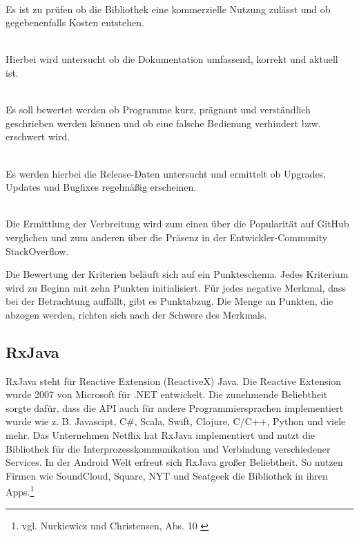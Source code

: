 \begin{description}
\item \criteriaLizenz \\
Es ist zu prüfen ob die Bibliothek eine kommerzielle Nutzung zulässt und ob gegebenenfalls Kosten entstehen.
\item \criteriaDoku \\
Hierbei wird untersucht ob die Dokumentation umfassend, korrekt und aktuell ist.
\clearpage
\item \criteriaHandhabung \\
Es soll bewertet werden ob Programme kurz, prägnant und verständlich geschrieben werden können und ob eine falsche Bedienung verhindert bzw. erschwert wird.
\item \criteriaWeiterentwicklung \\
Es werden hierbei die Release-Daten untersucht und ermittelt ob Upgrades, Updates und Bugfixes regelmäßig erscheinen.
\item \criteriaVerbreitung \\
Die Ermittlung der Verbreitung wird zum einen über die Popularität auf GitHub verglichen und zum anderen über die Präsenz in der Entwickler-Community StackOverflow.
\end{description}

Die Bewertung der Kriterien beläuft sich auf ein Punkteschema. Jedes Kriterium wird zu Beginn mit zehn Punkten initialisiert. Für jedes negative Merkmal, dass bei der Betrachtung auffällt, gibt es Punktabzug. Die Menge an Punkten, die abzogen werden, richten sich nach der Schwere des Merkmals.

\subsection{RxJava}
\label{eval:rxjava}
RxJava steht für Reactive Extension (ReactiveX) Java. Die Reactive Extension wurde 2007 von Microsoft für .NET entwickelt. Die zunehmende Beliebtheit sorgte dafür, dass die API auch für andere Programmiersprachen implementiert wurde wie z. B. Javascipt, C\#, Scala, Swift, Clojure, C/C++, Python und viele mehr. Das Unternehmen Netflix hat RxJava implementiert und nutzt die Bibliothek für die Interprozesskommunikation und Verbindung verschiedener Services. In der Android Welt erfreut sich RxJava großer Beliebtheit. So nutzen Firmen wie SoundCloud, Square, NYT und Seatgeek die Bibliothek in ihren Apps.\footnote{vgl. Nurkiewicz und Christensen, Abs. 10 \cite{buch:reactive_programming_with_rxjava:foreword}}

